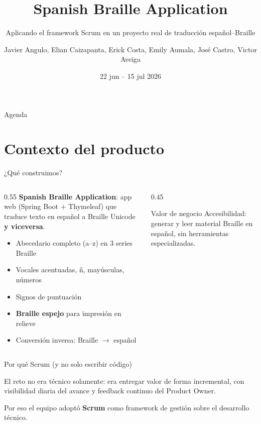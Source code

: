 \documentclass[11pt,aspectratio=169]{beamer}
\title{Spanish Braille Application}
\subtitle{Aplicando el framework Scrum en un proyecto real de traducción español--Braille}
\author{\small Javier Angulo, Elian Caizapanta, Erick Costa, Emily Aumala, José Castro, Victor Aveiga}
\institute{Escuela Politécnica Nacional --- Construcción y Evolución de Software}
\date{22 jun -- 15 jul 2026}
\begin{document}
\maketitle

\begin{frame}{Agenda}
  \tableofcontents
\end{frame}

\section{Contexto del producto}

\begin{frame}{¿Qué construimos?}
  \begin{columns}[T]
    \begin{column}{0.55\textwidth}
      \textbf{Spanish Braille Application}: app web (Spring Boot + Thymeleaf) que traduce texto en
      español a Braille Unicode \textbf{y viceversa}.
      \vspace{0.4cm}
      \begin{itemize}
        \item Abecedario completo (a--z) en 3 series Braille
        \item Vocales acentuadas, ñ, mayúsculas, números
        \item Signos de puntuación
        \item \textbf{Braille espejo} para impresión en relieve
        \item Conversión inversa: Braille $\rightarrow$ español
      \end{itemize}
    \end{column}
    \begin{column}{0.45\textwidth}
      \begin{alertblock}{Valor de negocio}
        Accesibilidad: generar y leer material Braille en español, sin herramientas especializadas.
      \end{alertblock}
    \end{column}
  \end{columns}
\end{frame}

\begin{frame}{Por qué Scrum (y no solo escribir código)}
  \begin{center}
    \Large
    El reto no era técnico solamente: era \alert{entregar valor de forma incremental},
    con \alert{visibilidad diaria} del avance y \alert{feedback} continuo del Product Owner.
  \end{center}
  \vspace{0.5cm}
  \begin{center}
    \small Por eso el equipo adoptó \textbf{Scrum} como framework de gestión sobre el desarrollo técnico.
  \end{center}
\end{frame}
\end{document}
